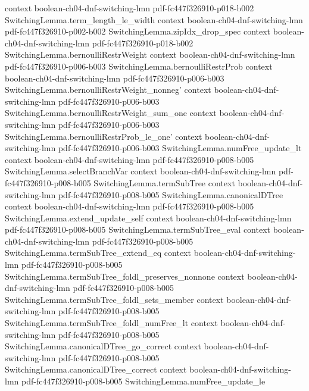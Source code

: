 \begin{theorem}
  {context}
  {boolean-ch04-dnf-switching-lmn}
  {pdf-fc447f326910-p018-b002}
\proofstep
  {SwitchingLemma.term_length_le_width}
  {context}
  {boolean-ch04-dnf-switching-lmn}
  {pdf-fc447f326910-p002-b002}
\proofstep
  {SwitchingLemma.zipIdx_drop_spec}
  {context}
  {boolean-ch04-dnf-switching-lmn}
  {pdf-fc447f326910-p018-b002}
\proofstep
  {SwitchingLemma.bernoulliRestrWeight}
  {context}
  {boolean-ch04-dnf-switching-lmn}
  {pdf-fc447f326910-p006-b003}
\proofstep
  {SwitchingLemma.bernoulliRestrProb}
  {context}
  {boolean-ch04-dnf-switching-lmn}
  {pdf-fc447f326910-p006-b003}
\proofstep
  {SwitchingLemma.bernoulliRestrWeight_nonneg'}
  {context}
  {boolean-ch04-dnf-switching-lmn}
  {pdf-fc447f326910-p006-b003}
\proofstep
  {SwitchingLemma.bernoulliRestrWeight_sum_one}
  {context}
  {boolean-ch04-dnf-switching-lmn}
  {pdf-fc447f326910-p006-b003}
\proofstep
  {SwitchingLemma.bernoulliRestrProb_le_one'}
  {context}
  {boolean-ch04-dnf-switching-lmn}
  {pdf-fc447f326910-p006-b003}
\proofstep
  {SwitchingLemma.numFree_update_lt}
  {context}
  {boolean-ch04-dnf-switching-lmn}
  {pdf-fc447f326910-p008-b005}
\proofstep
  {SwitchingLemma.selectBranchVar}
  {context}
  {boolean-ch04-dnf-switching-lmn}
  {pdf-fc447f326910-p008-b005}
\proofstep
  {SwitchingLemma.termSubTree}
  {context}
  {boolean-ch04-dnf-switching-lmn}
  {pdf-fc447f326910-p008-b005}
\proofstep
  {SwitchingLemma.canonicalDTree}
  {context}
  {boolean-ch04-dnf-switching-lmn}
  {pdf-fc447f326910-p008-b005}
\proofstep
  {SwitchingLemma.extend_update_self}
  {context}
  {boolean-ch04-dnf-switching-lmn}
  {pdf-fc447f326910-p008-b005}
\proofstep
  {SwitchingLemma.termSubTree_eval}
  {context}
  {boolean-ch04-dnf-switching-lmn}
  {pdf-fc447f326910-p008-b005}
\proofstep
  {SwitchingLemma.termSubTree_extend_eq}
  {context}
  {boolean-ch04-dnf-switching-lmn}
  {pdf-fc447f326910-p008-b005}
\proofstep
  {SwitchingLemma.termSubTree_foldl_preserves_nonnone}
  {context}
  {boolean-ch04-dnf-switching-lmn}
  {pdf-fc447f326910-p008-b005}
\proofstep
  {SwitchingLemma.termSubTree_foldl_sets_member}
  {context}
  {boolean-ch04-dnf-switching-lmn}
  {pdf-fc447f326910-p008-b005}
\proofstep
  {SwitchingLemma.termSubTree_foldl_numFree_lt}
  {context}
  {boolean-ch04-dnf-switching-lmn}
  {pdf-fc447f326910-p008-b005}
\proofstep
  {SwitchingLemma.canonicalDTree_go_correct}
  {context}
  {boolean-ch04-dnf-switching-lmn}
  {pdf-fc447f326910-p008-b005}
\proofstep
  {SwitchingLemma.canonicalDTree_correct}
  {context}
  {boolean-ch04-dnf-switching-lmn}
  {pdf-fc447f326910-p008-b005}
\proofstep
  {SwitchingLemma.numFree_update_le}

\end{theorem}
